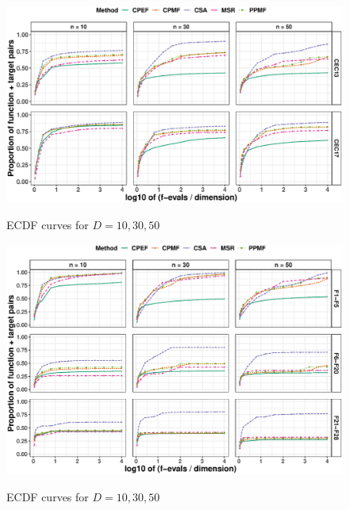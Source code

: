 \documentclass[runningheads,a4paper]{llncs}
\begin{document}
\begin{figure}[H]
  \centering
  \includegraphics[width=\textwidth]{cec-17-13}
  \label{cec17-ecdf}
  \caption{ECDF curves for $D = 10, 30, 50$}
\end{figure}

\begin{figure}[H]
  \centering
  \includegraphics[width=\textwidth]{problems-cec-13}
  \label{cec17-ecdf}
  \caption{ECDF curves for $D = 10, 30, 50$}
\end{figure}
\end{document}

